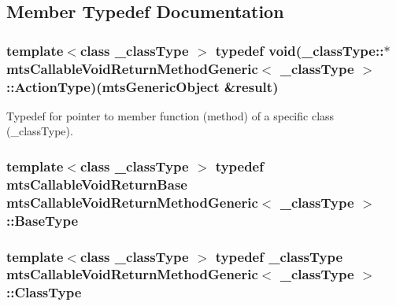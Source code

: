 \subsection{Member Typedef Documentation}
\hypertarget{classmts_callable_void_return_method_generic_afa8b798ea4b9627d189beecfdc6200b6}{
\subsubsection[{Action\-Type}]{\setlength{\rightskip}{0pt plus 5cm}template$<$class \-\_\-class\-Type $>$ typedef void(\-\_\-class\-Type\-::$\ast$ {\bf mts\-Callable\-Void\-Return\-Method\-Generic}$<$ \-\_\-class\-Type $>$\-::Action\-Type)({\bf mts\-Generic\-Object} \&result)}}\label{classmts_callable_void_return_method_generic_afa8b798ea4b9627d189beecfdc6200b6}
Typedef for pointer to member function (method) of a specific class (\-\_\-class\-Type). \hypertarget{classmts_callable_void_return_method_generic_aa1fd13b7b6b83b7825a8e7c56e9ac8cd}{
\subsubsection[{Base\-Type}]{\setlength{\rightskip}{0pt plus 5cm}template$<$class \-\_\-class\-Type $>$ typedef {\bf mts\-Callable\-Void\-Return\-Base} {\bf mts\-Callable\-Void\-Return\-Method\-Generic}$<$ \-\_\-class\-Type $>$\-::{\bf Base\-Type}}}\label{classmts_callable_void_return_method_generic_aa1fd13b7b6b83b7825a8e7c56e9ac8cd}
\hypertarget{classmts_callable_void_return_method_generic_ac65a16eb6baf786e6eba07bb920cbf1f}{
\subsubsection[{Class\-Type}]{\setlength{\rightskip}{0pt plus 5cm}template$<$class \-\_\-class\-Type $>$ typedef \-\_\-class\-Type {\bf mts\-Callable\-Void\-Return\-Method\-Generic}$<$ \-\_\-class\-Type $>$\-::{\bf Class\-Type}}}\label{classmts_callable_void_return_method_generic_ac65a16eb6baf786e6eba07bb920cbf1f}
